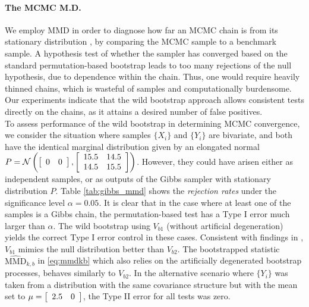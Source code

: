 \paragraph{The MCMC M.D.}
We employ MMD in order to diagnose how far an MCMC chain is from its stationary distribution \cite[Section 5]{sejdinovic_KAMH}, 
by comparing the MCMC sample to a benchmark sample. A hypothesis test of whether the sampler has converged based on the standard permutation-based bootstrap leads to too many rejections of the null hypothesis, due to  dependence within the chain. Thus, one would require heavily thinned chains, which is wasteful of samples and computationally burdensome.
Our experiments indicate that the wild bootstrap approach allows consistent tests directly on the chains, as it attains a desired number of false positives.\\
To assess performance of the wild bootstrap in determining MCMC convergence, we consider the situation where samples $\{X_i\}$ and $\{Y_i\}$ are bivariate, and both have the identical marginal distribution given by an elongated normal
$P=\mathcal{N}\left(\left[\protect\begin{array}{cc}
0 & 0\protect\end{array}\right],\left[\protect\begin{array}{cc}
15.5 & 14.5\protect\\
14.5 & 15.5
\protect\end{array}\right]\right)$.
However, they could have arisen either as independent samples, or as outputs of the Gibbs sampler with stationary distribution $P$. 
Table \ref{tab:gibbs_mmd} shows the \emph{rejection rates} under the significance level $\alpha=0.05$. It is clear that in the case where at least one of the samples is a Gibbs chain, the permutation-based test has a Type I error much larger than $\alpha$. 
The wild bootstrap using $V_{b1}$ (without artificial degeneration) yields the correct Type I error control in these cases. Consistent with findings in \cite[Section 5]{leucht_dependent_2013}, $V_{b1}$ mimics the null distribution better than $V_{b2}$. The bootstrapped statistic $\widehat{\text{MMD}}_{k,b}$ in \eqref{eq:mmdkb} which also relies on the artificially degenerated bootstrap processes, behaves similarly to $V_{b2}$.
In the alternative scenario where $\{Y_i\}$ was taken from a distribution with the same covariance structure but with the mean set to $\mu= \left[\protect\begin{array}{cc}
2.5 & 0\protect\end{array}\right]$, the Type II error for all tests was zero.
\vspace{-4mm}
